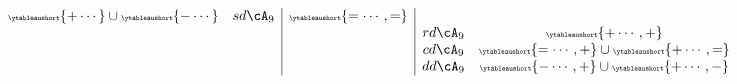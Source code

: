 \documentclass[12pt,a4paper]{amsart}
\numberwithin{equation}{section}
\theoremstyle{remark}
\let\ytb=\ytableaushort
\newcommand{\tytb}[1]{{\tiny\ytb{#1}}}
\begin{document}
{\begin{equation}
\begin{array}{cc|c|cc}
                                                            \tytb{+\cdots} \cup\tytb{-\cdots}    & sd\cA_{9} & \tytb{=\cdots,=}                 \\
                        &                    &                & rd\cA_{9} &\tytb{+\cdots,+}                                   \\
                        &                    &                & cd\cA_{9} &\tytb{=\cdots,+}  \cup \tytb{+\cdots,=}                \\
                        &                    &                & dd\cA_{9} &\tytb{-\cdots,+} \cup \tytb{+\cdots,-}                       \\
\end{array}
\end{equation}
}

\appendix
\end{document}
